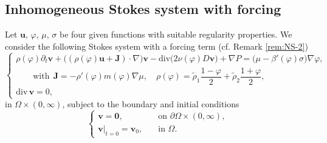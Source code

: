 \documentclass[11pt,reqno]{amsart}
\def\div{\mathrm{div}}
\def\J{\mathbf{J}}
\def\uu{\bm{u}}
\def\vv{\bm{v}}
\begin{document}
\subsection{Inhomogeneous Stokes system with forcing}
Let $\uu$, $\varphi$, $\mu$, $\sigma$ be four given functions with suitable regularity properties. We consider the following Stokes system with a forcing term (cf. Remark \ref{rem:NS-2})
%
\begin{equation}
 \label{NS-for}
\begin{cases}
\rho(\varphi)\partial_t \vv +  \big(( \rho(\varphi) \uu+ \J) \cdot\nabla \big)\vv - \div \big( 2\nu(\varphi) D \vv \big) + \nabla P = \big(\mu-\beta'(\varphi)  \sigma\big) \nabla \varphi,\\
\qquad \text{with} \ \ \J= -\rho'(\varphi) m(\varphi) \nabla \mu,\quad \rho(\varphi)= \widetilde{\rho}_1 \dfrac{1-\varphi}{2}+ \widetilde{\rho}_2 \dfrac{1+\varphi}{2},
\\
\div \, \vv=0,
\end{cases}
\end{equation}
%
in $\Omega \times (0,\infty)$, subject to the boundary and initial conditions
%
\begin{equation}
\label{NS-for-bic}
\begin{cases}
\vv=\mathbf{0},  \quad &\text{on }  \partial \Omega \times (0,\infty),\\
\vv|_{t=0}=\vv_0, \quad &\text{in } \Omega.
\end{cases}
\end{equation}
%
\end{document}
